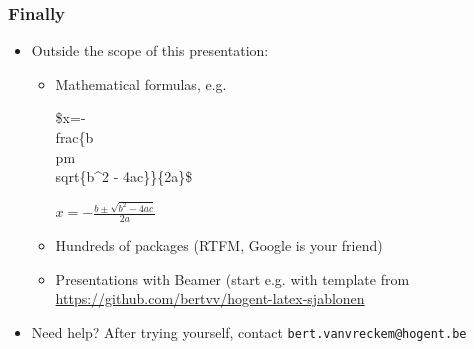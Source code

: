 \documentclass{beamer}
\begin{document}
\begin{frame}
  \frametitle{Finally}
  
  \begin{itemize}
  \item Outside the scope of this presentation:
    \begin{itemize}
    \item<+-> Mathematical formulas, e.g.
    \begin{semiverbatim}
    \$x=-\\frac\{b \\pm \\sqrt\{b\^{}2 - 4ac\}\}\{2a\}\$
    \end{semiverbatim}
    $x=-\frac{b \pm \sqrt{b^2 - 4ac}}{2a}$
    \item<+-> Hundreds of packages (RTFM, Google is your friend)
    \item<+-> Presentations with Beamer (start e.g. with template from \url{https://github.com/bertvv/hogent-latex-sjablonen}

    \end{itemize}
  \item<+-> Need help? After trying yourself, contact \texttt{bert.vanvreckem@hogent.be}
  \end{itemize}
\end{frame}
\end{document}
